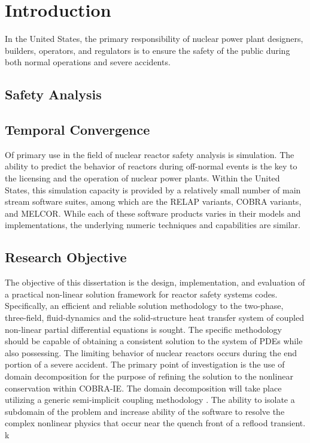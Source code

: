 \chapter{Introduction}
In the United States, the primary responsibility of nuclear power plant designers, builders, operators, and regulators is to ensure the safety of the public during both normal operations and severe accidents.

\section{Safety Analysis}

\section{Temporal Convergence}
Of primary use in the field of nuclear reactor safety analysis is simulation.
The ability to predict the behavior of reactors during off-normal events is the key to the licensing and the operation of nuclear power plants.
Within the United States, this simulation capacity is provided by a relatively small number of main stream software suites, among which are the RELAP variants, COBRA variants, and MELCOR.
While each of these software products varies in their models and implementations, the underlying numeric techniques and capabilities are similar.

\section{Research Objective}
The objective of this dissertation is the design, implementation, and evaluation of a practical non-linear solution framework for reactor safety systems codes.
Specifically, an efficient and reliable solution methodology to the two-phase, three-field, fluid-dynamics and the solid-structure heat transfer system of coupled non-linear partial differential equations is sought.
The specific methodology should be capable of obtaining a consistent solution to the system of PDEs while also possessing. \cite{Aktas1996}
The limiting behavior of nuclear reactors occurs during the end portion of a severe accident.
The primary point of investigation is the use of domain decomposition for the purpose of refining the solution to the nonlinear conservation within COBRA-IE.
The domain decomposition will take place utilizing a generic semi-implicit coupling methodology \cite{Weaver2002}.
The ability to isolate a subdomain of the problem and increase ability of the software to resolve the complex nonlinear physics that occur near the quench front of a reflood transient.
k